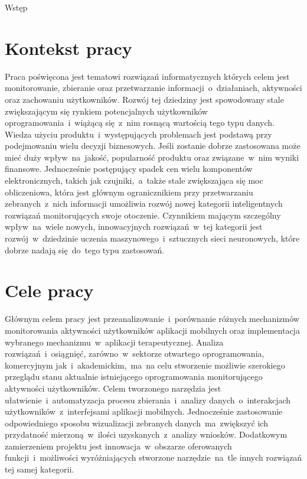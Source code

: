 \begin{chapter}{Wstęp}
	\newcommand{\chapterPath}{chapters/Introduction}

	\section{Kontekst pracy}
	Praca poświęcona jest tematowi rozwiązań informatycznych których celem jest monitorowanie, zbieranie oraz przetwarzanie informacji~o~działaniach, aktywności oraz zachowaniu użytkowników. Rozwój tej dziedziny jest spowodowany stale zwiększającym się rynkiem potencjalnych użytkowników oprogramowania~i~wiążącą się~z~nim rosnącą wartością tego typu danych. Wiedza użyciu produktu~i~występujących problemach jest podstawą przy podejmowaniu wielu decyzji biznesowych. Jeśli zostanie dobrze zastosowana może mieć duży wpływ~na~jakość, popularność produktu oraz związane~w~nim wyniki finansowe. Jednocześnie postępujący spadek cen wielu komponentów elektronicznych, takich jak czujniki,~a~także stale zwiększająca się moc obliczeniowa, która jest głównym ogranicznikiem  przy przetwarzaniu zebranych~z~nich informacji umożliwia rozwój nowej kategorii inteligentnych rozwiązań monitorujących swoje otoczenie. Czynnikiem mającym szczególny wpływ~na~wiele nowych, innowacyjnych rozwiązań~w~tej kategorii jest rozwój~w~dziedzinie uczenia maszynowego~i~sztucznych sieci neuronowych, które dobrze nadają się~do~tego typu zastosowań.
	
	\section{Cele pracy}
	Głównym celem pracy jest przeanalizowanie~i~porównanie różnych mechanizmów monitorowania aktywności użytkowników aplikacji mobilnych oraz implementacja wybranego mechanizmu~w~aplikacji terapeutycznej. Analiza rozwiązań~i~osiągnięć, zarówno~w~sektorze otwartego oprogramowania, komercyjnym jak~i~akademickim,~ma~na celu stworzenie możliwie szerokiego przeglądu stanu aktualnie istniejącego oprogramowania monitorującego aktywności użytkowników. Celem tworzonego narzędzia jest ułatwienie~i~automatyzacja procesu zbierania~i~analizy danych~o~interakcjach użytkowników~z~interfejsami aplikacji mobilnych. Jednocześnie zastosowanie odpowiedniego sposobu wizualizacji zebranych danych~ma~zwiększyć ich przydatność mierzoną~w~ilości uzyskanych~z~analizy wniosków. Dodatkowym zamierzeniem projektu jest innowacja~w~obszarze oferowanych funkcji~i~możliwości wyróżniających stworzone narzędzie~na~tle innych rozwiązań tej samej kategorii.
	

\end{chapter}
